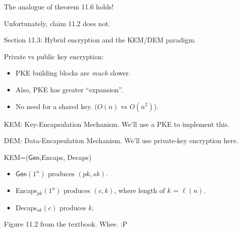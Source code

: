 \documentclass[12pt]{article}
\newcommand{\Gen}{\mathsf{Gen}}
\begin{document}
The analogue of theorem 11.6 holds!

Unfortunately, claim 11.2 does not.

Section 11.3: Hybrid encryption and the KEM/DEM paradigm.

Private vs public key encryption:\begin{itemize}

\item PKE building blocks are {\it much} slower.

\item Also, PKE has greater ``expansion''.

\item No need for a shared key. ($O(n)$ vs $O(n^2)$).

\end{itemize}

KEM: Key-Encapsulation Mechanism. We'll use a PKE to implement this.

DEM: Data-Encapsulation Mechanism. We'll use private-key encryption here.

KEM=($\Gen$,Encaps, Decaps)\begin{itemize}

\item $\Gen(1^n)$ produces $(pk,sk)$.

\item Encaps$_{pk}(1^n)$ produces $(c,k)$, where length of $k$ = $\ell(n)$.

\item Decaps$_{sk}(c)$ produces $k$.

\end{itemize}

Figure 11.2 from the textbook. Whee. :P
\end{document}
